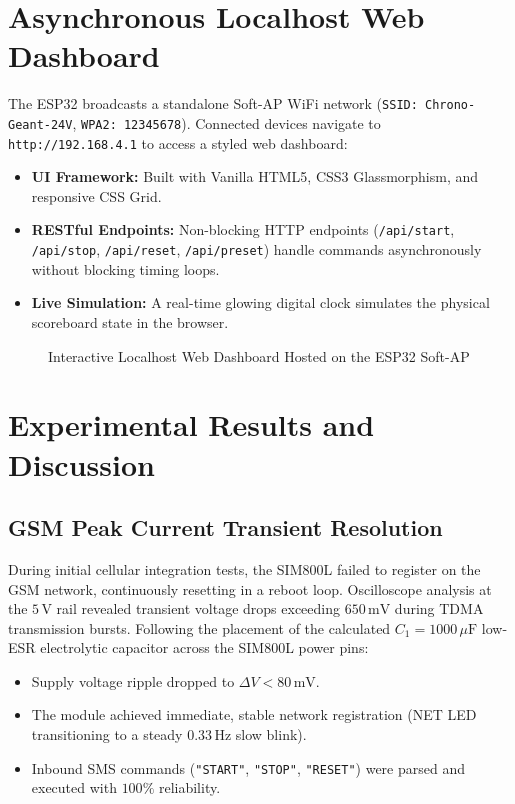 \documentclass[12pt,a4paper,oneside]{report}
\begin{document}
\section{Asynchronous Localhost Web Dashboard}
The ESP32 broadcasts a standalone Soft-AP WiFi network (\texttt{SSID: Chrono-Geant-24V}, \texttt{WPA2: 12345678}). Connected devices navigate to \texttt{http://192.168.4.1} to access a styled web dashboard:
\begin{itemize}
    \item \textbf{UI Framework:} Built with Vanilla HTML5, CSS3 Glassmorphism, and responsive CSS Grid.
    \item \textbf{RESTful Endpoints:} Non-blocking HTTP endpoints (\texttt{/api/start}, \texttt{/api/stop}, \texttt{/api/reset}, \texttt{/api/preset}) handle commands asynchronously without blocking timing loops.
    \item \textbf{Live Simulation:} A real-time glowing digital clock simulates the physical scoreboard state in the browser.
\end{itemize}

\begin{figure}[H]
\centering
\caption{Interactive Localhost Web Dashboard Hosted on the ESP32 Soft-AP}
\label{fig:dashboard_ui}
\end{figure}

\section{Experimental Results and Discussion}

\subsection{GSM Peak Current Transient Resolution}
During initial cellular integration tests, the SIM800L failed to register on the GSM network, continuously resetting in a reboot loop. Oscilloscope analysis at the $5\,\text{V}$ rail revealed transient voltage drops exceeding $650\,\text{mV}$ during TDMA transmission bursts.
Following the placement of the calculated $C_1 = 1000\,\mu\text{F}$ low-ESR electrolytic capacitor across the SIM800L power pins:
\begin{itemize}
    \item Supply voltage ripple dropped to $\Delta V < 80\,\text{mV}$.
    \item The module achieved immediate, stable network registration (NET LED transitioning to a steady $0.33\,\text{Hz}$ slow blink).
    \item Inbound SMS commands (\texttt{"START"}, \texttt{"STOP"}, \texttt{"RESET"}) were parsed and executed with $100\%$ reliability.
\end{itemize}
\end{document}

